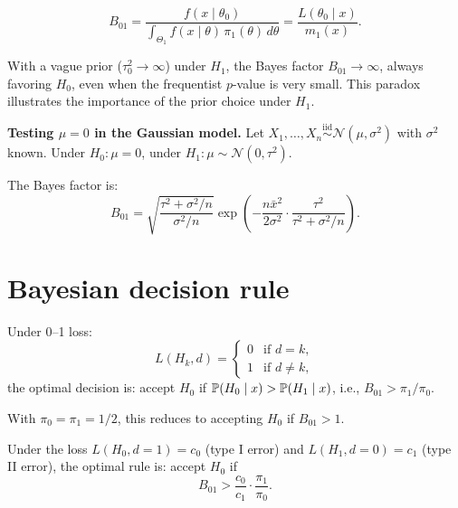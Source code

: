 \begin{theorem}
\[
  B_{01} = \frac{f(x \mid \theta_0)}
  {\int_{\Theta_1} f(x \mid \theta)\,\pi_1(\theta)\,d\theta}
  = \frac{L(\theta_0 \mid x)}{m_1(x)}.
\]
\end{theorem}

\begin{warning}[title=\textbf{Jeffreys--Lindley paradox}]
With a vague prior ($\tau_0^2 \to \infty$) under $H_1$, the Bayes
factor $B_{01} \to \infty$, always favoring $H_0$, even when the
frequentist $p$-value is very small. This paradox illustrates the
importance of the prior choice under $H_1$.
\end{warning}

\begin{example}
\textbf{Testing $\mu = 0$ in the Gaussian model.}
Let $X_1, \ldots, X_n \overset{\text{iid}}{\sim} \mathcal{N}(\mu, \sigma^2)$
with $\sigma^2$ known. Under $H_0 : \mu = 0$, under
$H_1 : \mu \sim \mathcal{N}(0, \tau^2)$.

The Bayes factor is:
\[
  B_{01} = \sqrt{\frac{\tau^2 + \sigma^2/n}{\sigma^2/n}}
  \exp\!\left(-\frac{n\bar{x}^2}{2\sigma^2}
  \cdot \frac{\tau^2}{\tau^2 + \sigma^2/n}\right).
\]
\end{example}

\section{Bayesian decision rule}

\begin{definition}
Under 0--1 loss:
\[
  L(H_k, d) = \begin{cases}
  0 & \text{if } d = k, \\
  1 & \text{if } d \neq k,
  \end{cases}
\]
the optimal decision is: accept $H_0$ if
$\mathbb{P}(H_0 \mid x) > \mathbb{P}(H_1 \mid x)$, i.e., $B_{01} > \pi_1/\pi_0$.

With $\pi_0 = \pi_1 = 1/2$, this reduces to accepting $H_0$ if $B_{01} > 1$.
\end{definition}

\begin{theorem}
Under the loss $L(H_0, d=1) = c_0$ (type I error) and
$L(H_1, d=0) = c_1$ (type II error), the optimal rule is: accept
$H_0$ if
\[
  B_{01} > \frac{c_0}{c_1} \cdot \frac{\pi_1}{\pi_0}.
\]
\end{theorem}

